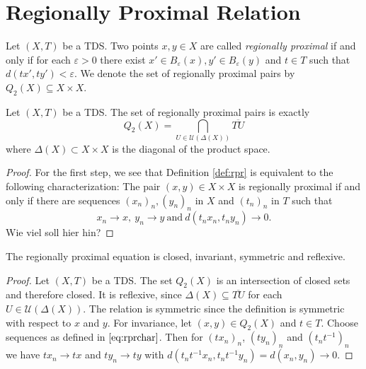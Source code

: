 \section{Regionally Proximal Relation}

\begin{definition}
  \label{def:rpr}
  Let $(X, T)$ be a TDS.
  Two points $x,y \in X$ are called \emph{regionally proximal}
  if and only if for each $\varepsilon > 0$ there exist $x' \in B_\varepsilon(x), y' \in B_\varepsilon(y)$
  and $t \in T$ such that $d(tx', ty') < \varepsilon$.
  We denote the set of regionally proximal pairs by $Q_2(X) \subseteq X \times X$.
\end{definition}


\begin{theorem}
  Let $(X, T)$ be a TDS.
  The set of regionally proximal pairs is exactly
  \[ Q_2(X) = \bigcap_{U \in \mathcal{U}(\Delta(X))} \overline{TU}  \]
  where $\Delta(X) \subset X \times X$ is the diagonal of the product space.
\end{theorem}

\begin{proof}
  For the first step, we see that Definition \ref{def:rpr} is equivalent to the following characterization:
  The pair $(x, y) \in X \times X$ is regionally proximal if and only if there are sequences $(x_n)_n, (y_n)_n$ in $X$ and $(t_n)_n$ in $T$
  such that
  \begin{equation}
    \label{eq:rprchar}
    x_n \to x, \ y_n \to y \ \text{and} \ d(t_n x_n, t_n y_n) \to 0.
  \end{equation}
  {\color{red} Wie viel soll hier hin?}
\end{proof}

\begin{theorem}
  The regionally proximal equation is closed, invariant, symmetric and reflexive.
\end{theorem}

\begin{proof}
  Let $(X, T)$ be a TDS.
  The set $Q_2(X)$ is an intersection of closed sets and therefore closed.
  It is reflexive, since $\Delta(X) \subseteq \overline{TU}$ for each $U \in \mathcal{U}(\Delta(X))$.
  The relation is symmetric since the definition is symmetric with respect to $x$ and $y$.
  For invariance, let $(x, y) \in Q_2(X)$ and $t \in T$.
  Choose sequences as defined in $\ref{eq:rprchar}$.
  Then for $(tx_n)_n$, $(t y_n)_n$ and $(t_nt^{-1})_n$ we have $t x_n \to tx$ and $t y_n \to ty$ with $d(t_nt^{-1}x_n, t_nt^{-1}y_n) = d(x_n, y_n) \to 0$.
\end{proof}

